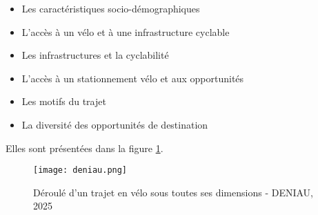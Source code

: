 \begin{itemize} \label{categories_eq}
    \item Les caractéristiques socio-démographiques
    \item L'accès à un vélo et à une infrastructure cyclable
    \item Les infrastructures et la cyclabilité
    \item L'accès à un stationnement vélo et aux opportunités
    \item Les motifs du trajet
    \item La diversité des opportunités de destination
\end{itemize}
Elles sont présentées dans la figure \ref{fig:d1}.

\begin{figure}[h]
    \centering
    \texttt{[image: deniau.png]}
    \caption{Déroulé d'un trajet en vélo sous toutes ses dimensions - DENIAU, 2025}
    \label{fig:d1}
\end{figure}


